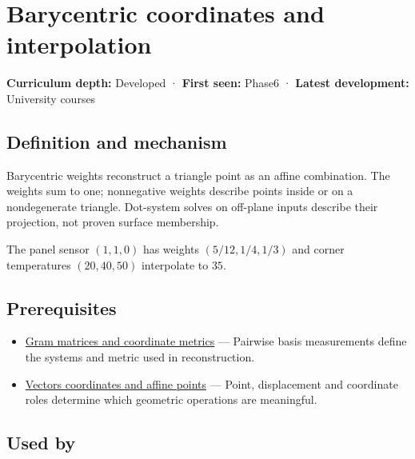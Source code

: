 \hypertarget{appendix-02b9d9a81dca}{}
\section{Barycentric coordinates and interpolation}\label{appendix-02b9d9a81dca-barycentric-coordinates-and-interpolation}

\textbf{Curriculum depth:} Developed · \textbf{First seen:} Phase6 · \textbf{Latest development:} University courses

\subsection{Definition and mechanism}\label{appendix-02b9d9a81dca-definition-and-mechanism}

Barycentric weights reconstruct a triangle point as an affine combination. The weights sum to one; nonnegative weights describe points inside or on a nondegenerate triangle. Dot-system solves on off-plane inputs describe their projection, not proven surface membership.

The panel sensor \((1,1,0)\) has weights \((5/12,1/4,1/3)\) and corner temperatures \((20,40,50)\) interpolate to \(35\).

\subsection{Prerequisites}\label{appendix-02b9d9a81dca-prerequisites}

\begin{itemize}
\tightlist
\item
  \hyperref[appendix-3b863809f82a]{Gram matrices and coordinate metrics} --- Pairwise basis measurements define the systems and metric used in reconstruction.
\item
  \hyperref[appendix-0659864c0aa3]{Vectors coordinates and affine points} --- Point, displacement and coordinate roles determine which geometric operations are meaningful.
\end{itemize}

\subsection{Used by}\label{appendix-02b9d9a81dca-used-by}


